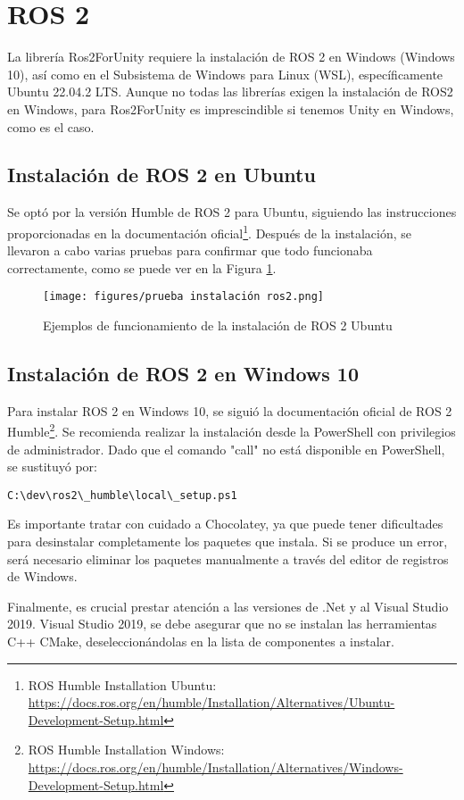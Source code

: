 \section{ROS 2}
La librería Ros2ForUnity requiere la instalación de ROS 2 en Windows (Windows 10), así como en el Subsistema de Windows para Linux (WSL), específicamente Ubuntu 22.04.2 LTS. Aunque no todas las librerías exigen la instalación de ROS2 en Windows, para Ros2ForUnity es imprescindible si tenemos Unity en Windows, como es el caso.

\subsection{Instalación de ROS 2 en Ubuntu}
Se optó por la versión Humble de ROS 2 para Ubuntu, siguiendo las instrucciones proporcionadas en la documentación oficial\footnote{ROS Humble Installation Ubuntu: \url{https://docs.ros.org/en/humble/Installation/Alternatives/Ubuntu-Development-Setup.html}}. Después de la instalación, se llevaron a cabo varias pruebas para confirmar que todo funcionaba correctamente, como se puede ver en la Figura \ref{figure:ros2-examples-installation-Ubuntu}.

\begin{figure}[ht]
   \centering
    \texttt{[image: figures/prueba instalación ros2.png]}
   \caption{Ejemplos de funcionamiento de la instalación de ROS 2 Ubuntu}
   \label{figure:ros2-examples-installation-Ubuntu}
\end{figure}

\subsection{Instalación de ROS 2 en Windows 10}
Para instalar ROS 2 en Windows 10, se siguió la documentación oficial de ROS 2 Humble\footnote{ROS Humble Installation Windows: \url{https://docs.ros.org/en/humble/Installation/Alternatives/Windows-Development-Setup.html}}. Se recomienda realizar la instalación desde la PowerShell con privilegios de administrador. Dado que el comando "call" no está disponible en PowerShell, se sustituyó por:

\begin{verbatim}
C:\dev\ros2\_humble\local\_setup.ps1
\end{verbatim}



Es importante tratar con cuidado a Chocolatey, ya que puede tener dificultades para desinstalar completamente los paquetes que instala. Si se produce un error, será necesario eliminar los paquetes manualmente a través del editor de registros de Windows.



Finalmente, es crucial prestar atención a las versiones de .Net y al Visual Studio 2019. Visual Studio 2019, se debe asegurar que no se instalan las herramientas C++ CMake, deseleccionándolas en la lista de componentes a instalar.
